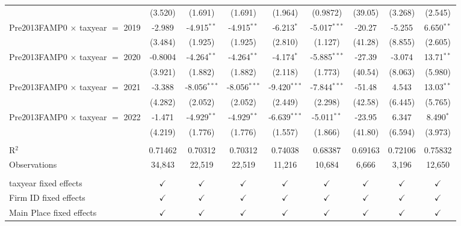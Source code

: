 \begin{tabular}{lcccccccc}
                                           & (3.520)       & (1.691)        & (1.691)        & (1.964)        & (0.9872)       & (39.05)       & (3.268)        & (2.545)\\   
   Pre2013FAMP0 $\times$ taxyear $=$ 2019  & -2.989        & -4.915$^{**}$  & -4.915$^{**}$  & -6.213$^{*}$   & -5.017$^{***}$ & -20.27        & -5.255         & 6.650$^{**}$\\   
                                           & (3.484)       & (1.925)        & (1.925)        & (2.810)        & (1.127)        & (41.28)       & (8.855)        & (2.605)\\   
   Pre2013FAMP0 $\times$ taxyear $=$ 2020  & -0.8004       & -4.264$^{**}$  & -4.264$^{**}$  & -4.174$^{*}$   & -5.885$^{***}$ & -27.39        & -3.074         & 13.71$^{**}$\\   
                                           & (3.921)       & (1.882)        & (1.882)        & (2.118)        & (1.773)        & (40.54)       & (8.063)        & (5.980)\\   
   Pre2013FAMP0 $\times$ taxyear $=$ 2021  & -3.388        & -8.056$^{***}$ & -8.056$^{***}$ & -9.420$^{***}$ & -7.844$^{***}$ & -51.48        & 4.543          & 13.03$^{**}$\\   
                                           & (4.282)       & (2.052)        & (2.052)        & (2.449)        & (2.298)        & (42.58)       & (6.445)        & (5.765)\\   
   Pre2013FAMP0 $\times$ taxyear $=$ 2022  & -1.471        & -4.929$^{**}$  & -4.929$^{**}$  & -6.639$^{***}$ & -5.011$^{**}$  & -23.95        & 6.347          & 8.490$^{*}$\\   
                                           & (4.219)       & (1.776)        & (1.776)        & (1.557)        & (1.866)        & (41.80)       & (6.594)        & (3.973)\\   
    \\
   R$^2$                                   & 0.71462       & 0.70312        & 0.70312        & 0.74038        & 0.68387        & 0.69163       & 0.72106        & 0.75832\\  
   Observations                            & 34,843        & 22,519         & 22,519         & 11,216         & 10,684         & 6,666         & 3,196          & 12,650\\  
    \\
   taxyear fixed effects                   & $\checkmark$  & $\checkmark$   & $\checkmark$   & $\checkmark$   & $\checkmark$   & $\checkmark$  & $\checkmark$   & $\checkmark$\\   
   Firm ID fixed effects                   & $\checkmark$  & $\checkmark$   & $\checkmark$   & $\checkmark$   & $\checkmark$   & $\checkmark$  & $\checkmark$   & $\checkmark$\\   
   Main Place fixed effects                & $\checkmark$  & $\checkmark$   & $\checkmark$   & $\checkmark$   & $\checkmark$   & $\checkmark$  & $\checkmark$   & $\checkmark$\\   
   \bottomrule
\end{tabular}
\par\endgroup
